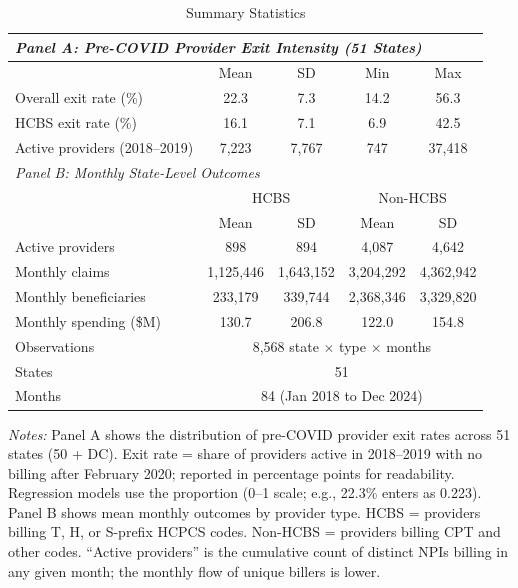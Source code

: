 \begin{table}[t]
\centering
\caption{Summary Statistics}
\label{tab:summary}
\begin{tabular}{lcccc}
\toprule
\multicolumn{5}{l}{\textit{Panel A: Pre-COVID Provider Exit Intensity (51 States)}} \\
\midrule
 & Mean & SD & Min & Max \\
Overall exit rate (\%) & 22.3 & 7.3 & 14.2 & 56.3 \\
HCBS exit rate (\%) & 16.1 & 7.1 & 6.9 & 42.5 \\
Active providers (2018--2019) & 7,223 & 7,767 & 747 & 37,418 \\
\midrule
\multicolumn{5}{l}{\textit{Panel B: Monthly State-Level Outcomes}} \\
\midrule
 & \multicolumn{2}{c}{HCBS} & \multicolumn{2}{c}{Non-HCBS} \\
 & Mean & SD & Mean & SD \\
Active providers & 898 & 894 & 4,087 & 4,642 \\
Monthly claims & 1,125,446 & 1,643,152 & 3,204,292 & 4,362,942 \\
Monthly beneficiaries & 233,179 & 339,744 & 2,368,346 & 3,329,820 \\
Monthly spending (\$M) & 130.7 & 206.8 & 122.0 & 154.8 \\
\midrule
Observations & \multicolumn{4}{c}{8,568 state $\times$ type $\times$ months} \\
States & \multicolumn{4}{c}{51} \\
Months & \multicolumn{4}{c}{84 (Jan 2018 to Dec 2024)} \\
\bottomrule
\end{tabular}
\begin{minipage}{0.95\textwidth}
\vspace{0.2cm}
\footnotesize \textit{Notes:} Panel A shows the distribution of pre-COVID provider exit rates across 51 states (50 + DC). Exit rate = share of providers active in 2018--2019 with no billing after February 2020; reported in percentage points for readability. Regression models use the proportion (0--1 scale; e.g., 22.3\% enters as 0.223). Panel B shows mean monthly outcomes by provider type. HCBS = providers billing T, H, or S-prefix HCPCS codes. Non-HCBS = providers billing CPT and other codes. ``Active providers'' is the cumulative count of distinct NPIs billing in any given month; the monthly flow of unique billers is lower.
\end{minipage}
\end{table}
